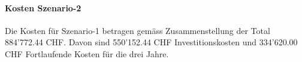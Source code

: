 \paragraph*{Kosten Szenario-2}
Die Kosten für Szenario-1 betragen gemäss Zusammenstellung der Total 884'772.44 CHF. Davon sind 550'152.44 CHF Investitionskosten und 334'620.00 CHF Fortlaufende Kosten für die drei Jahre.



 


